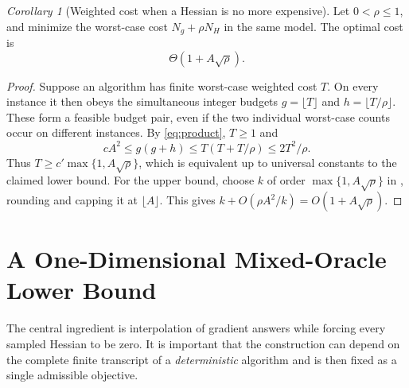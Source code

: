 \documentclass[11pt]{article}
\newtheorem{corollary}[theorem]{Corollary}
\theoremstyle{remark}
\newtheorem{corollary}[corollary]{Corollary}
\theoremstyle{remark}
\begin{document}
\begin{corollary}[Weighted cost when a Hessian is no more expensive]\label{cor:weighted}
Let $0<\rho\le1$, and minimize the worst-case cost $N_g+\rho N_H$ in the same model. The optimal cost is
\[
 \Theta(1+A\sqrt\rho).
\]
\end{corollary}
\begin{proof}
Suppose an algorithm has finite worst-case weighted cost $T$.
On every instance it then obeys the simultaneous integer budgets
$g=\lfloor T\rfloor$ and $h=\lfloor T/\rho\rfloor$.
These form a feasible budget pair, even if the two individual worst-case
counts occur on different instances. By \eqref{eq:product}, $T\ge1$ and
\[
 cA^2\le g(g+h)\le T(T+T/\rho)\le 2T^2/\rho.
\]
Thus $T\ge c'\max\{1,A\sqrt\rho\}$, which is equivalent up to
universal constants to the claimed lower bound.
For the upper bound, choose $k$ of order $\max\{1,A\sqrt\rho\}$ in , rounding and capping it at $\lfloor A\rfloor$. This gives
$k+O(\rho A^2/k)=O(1+A\sqrt\rho)$.
\end{proof}

\section{A One-Dimensional Mixed-Oracle Lower Bound}\label{sec:oned}
The central ingredient is interpolation of gradient answers while forcing every sampled Hessian to be zero. It is important that the construction can depend on the complete finite transcript of a \emph{deterministic} algorithm and is then fixed as a single admissible objective.
\end{document}
